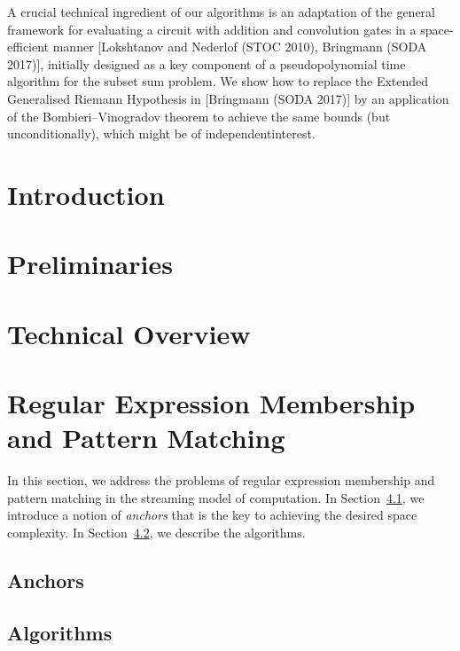 \begin{small}
A crucial technical ingredient of our algorithms is an adaptation of the general framework for evaluating a circuit with addition and convolution gates in a space-efficient manner [Lokshtanov and Nederlof (STOC 2010), Bringmann (SODA 2017)], initially designed as a key component of a pseudopolynomial time algorithm for the subset sum problem. We show how to replace the Extended Generalised Riemann Hypothesis in [Bringmann (SODA 2017)] by an application of the Bombieri--Vinogradov theorem to achieve the same bounds (but unconditionally), which might be of independentinterest.
\end{small}

\section{Introduction}
\label{regexp:sec:introduction}


\section{Preliminaries}
\label{regexp:sec:prelim}


\section{Technical Overview}
\label{regexp:sec:overview}


\section{Regular Expression Membership and Pattern Matching}\label{sec:regexp}
In this section, we address the problems of regular expression membership and pattern matching in the streaming model of computation. In Section~\ref{regexp:sec:anchors}, we introduce a notion of \emph{anchors} that is the key to achieving the desired space complexity. In Section~\ref{regexp:sec:algorithms}, we describe the algorithms.

\subsection{Anchors}
\label{regexp:sec:anchors}


\subsection{Algorithms}
\label{regexp:sec:algorithms}


